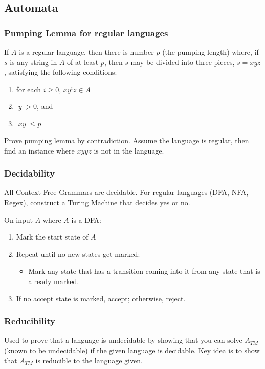 \documentclass[7pt]{article}
\begin{document}
\begin{multicols*}{4}
\subsection*{Automata}

\subsubsection*{Pumping Lemma for regular languages}
If $A$ is a regular language, then there is number $p$ (the pumping length) where, if $s$ is any string in $A$ of at least $p$, then $s$ may be divided into three pieces, $s = xyz$, satisfying the following conditions:
\begin{enumerate}
\item for each $i \geq 0$, $xy^iz \in A$
\item $|y| > 0$, and
\item $|xy| \leq p$
\end{enumerate}

Prove pumping lemma by contradiction.  Assume the language is regular, then find an instance where $xyyz$ is not in the language.

\subsubsection*{Decidability}
All Context Free Grammars are decidable.  For regular languages (DFA, NFA, Regex), construct a Turing Machine that decides yes or no.

\noindent
On input $A$ where $A$ is a DFA:
\begin{enumerate}
\item Mark the start state of $A$
\item Repeat until no new states get marked:
\begin{itemize}
\item Mark any state that has a transition coming into it from any state that is already marked.
\end{itemize}
\item If no accept state is marked, accept; otherwise, reject.
\end{enumerate}

\subsubsection*{Reducibility}
Used to prove that a language is undecidable by showing that you can solve $A_{TM}$ (known to be undecidable) if the given language is decidable.  Key idea is to show that $A_{TM}$ is reducible to the language given.


\end{multicols*}
\end{document}
